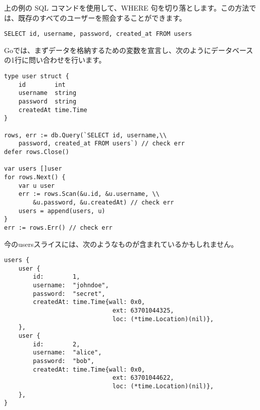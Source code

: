 上の例の SQL コマンドを使用して、WHERE 句を切り落とします。この方法では、既存のすべてのユーザーを照会することができます。

\begin{lstlisting}[numbers=none]
SELECT id, username, password, created_at FROM users
\end{lstlisting}

Goでは、まずデータを格納するための変数を宣言し、次のようにデータベースの1行に問い合わせを行います。

\begin{lstlisting}[numbers=none]
type user struct {
    id        int
    username  string
    password  string
    createdAt time.Time
}

rows, err := db.Query(`SELECT id, username,\\
    password, created_at FROM users`) // check err
defer rows.Close()

var users []user
for rows.Next() {
    var u user
    err := rows.Scan(&u.id, &u.username, \\
        &u.password, &u.createdAt) // check err
    users = append(users, u)
}
err := rows.Err() // check err
\end{lstlisting}

今のusersスライスには、次のようなものが含まれているかもしれません。

\begin{lstlisting}[numbers=none]
users {
    user {
        id:        1,
        username:  "johndoe",
        password:  "secret",
        createdAt: time.Time{wall: 0x0,
                              ext: 63701044325,
                              loc: (*time.Location)(nil)},
    },
    user {
        id:        2,
        username:  "alice",
        password:  "bob",
        createdAt: time.Time{wall: 0x0,
                              ext: 63701044622,
                              loc: (*time.Location)(nil)},
    },
}
\end{lstlisting}







